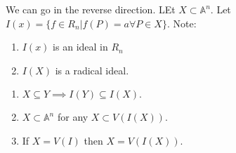 \documentclass{article}
\numberwithin{equation}{section}
\begin{document}
We can go in the reverse direction. LEt $X\subset \mathbb{A}^n.$ Let $I(x) = \{f\in R_n|f(P)=a\forall P\in X\}.$ Note:
\begin{enumerate}[label=(\roman*)]
    \item $I(x)$ is an ideal in $R_n$
    \item $I(X)$ is a radical ideal.
\end{enumerate}
\begin{proposition}
    \begin{enumerate}[label=(\alph*)]
        \item $X \subseteq Y \implies I(Y)\subseteq I(X).$
        \item $X\subset \mathbb{A}^n$ for any $X\subset V(I(X)).$
        \item If $X=V(I)$ then $X=V(I(X)).$
    \end{enumerate}
\end{proposition}
\end{document}
